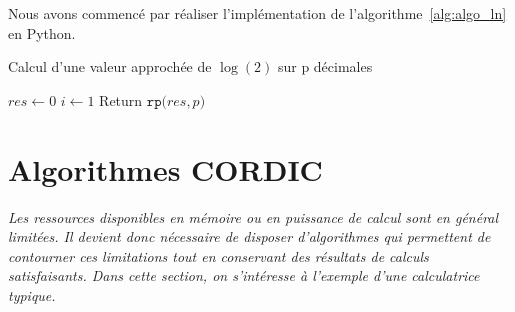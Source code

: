 \documentclass{article}
\begin{document}
Nous avons commencé par réaliser l'implémentation de l'algorithme~\ref{alg:algo_ln} en Python.

\begin{algorithm}
  \caption{Calcul d'une valeur approchée de $\log(2)$ sur p d\'ecimales}
  \label{alg:algo_ln}
  $res \gets 0$\;
  $i \gets 1$\;
  Return $\texttt{rp(}res,p\texttt{)}$\;
\end{algorithm}







 



  




\section{Algorithmes CORDIC}
\label{sec:cordic}

\textit{Les ressources disponibles en m\'emoire ou en puissance de calcul sont en g\'en\'eral limit\'ees. Il devient donc n\'ecessaire de disposer d'algorithmes qui permettent de contourner ces limitations tout en conservant des résultats de calculs satisfaisants. Dans cette section, on s'int\'eresse à l'exemple d'une calculatrice typique.}
\vskip 1mm ~


\end{document}
